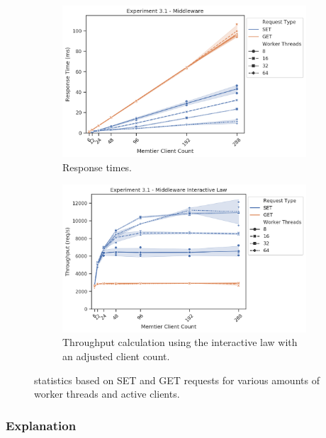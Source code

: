 \begin{figure}
{\begin{subfigure}[t!]{0.55\textwidth}
                    \includegraphics[width=1\textwidth]{../data_analysis/figures/3-1_mw_response_time.png}
                    \caption{Response times.\label{fig:single_mw_rt}}
                \end{subfigure}
                \begin{subfigure}[t!]{0.55\textwidth}
                    \centering
                    \includegraphics[width=1\textwidth]{../data_analysis/figures/3-1_mw_throughput-il.png}
                    \caption{Throughput calculation using the interactive law with an adjusted client
                             count.\label{fig:single_mw_tp-il}}
                \end{subfigure}
            }
            \caption{\mw{} statistics based on SET and GET requests for various amounts of worker threads and active
                     clients.\label{fig:single_mw_all}}
        \end{figure}

        \subsubsection{Explanation\label{subsubsec:3_one-middleware_summary}}

